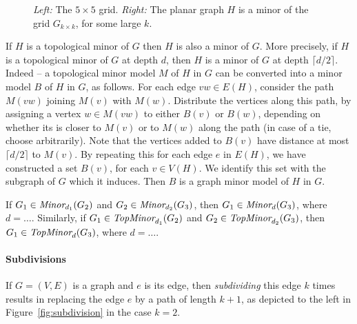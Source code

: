 \begin{example}
\begin{figure}[h]
	  \caption{\emph{Left:} The $5\times 5$ grid.
	  \emph{Right:} The planar graph $H$ is a minor of the grid $G_{k\times k}$,
	  for some large $k$.
	  } 
	  \label{fig:grid}
	\end{figure}	

\end{example}

\begin{example}\label{ex:topminor-minor}
	If $H$ is a topological minor of $G$ then $H$ is also a minor of $G$.
	More precisely, if $H$ is a topological minor of $G$ at depth $d$,
	then $H$ is a minor of $G$ at depth $\lceil d/2 \rceil$.
	Indeed -- a topological minor model $M$ of $H$ in $G$
	can be converted into a minor model $B$ of $H$ in $G$, as follows.
	For each edge $vw\in E(H)$, consider the path $M(vw)$ joining $M(v)$
	with $M(w)$. Distribute the vertices along this path, by assigning a vertex $w\in M(vw)$ 
	to either $B(v)$ or $B(w)$, depending on whether its is closer to $M(v)$
	or to $M(w)$ along the path (in case of a tie, choose arbitrarily).
	Note that the vertices added to $B(v)$ have distance at most $\lceil d/2\rceil$ to $M(v)$.
	By repeating this for each edge $e$ in $E(H)$, we have constructed a set $B(v)$, for each $v\in V(H)$. We identify this set with the subgraph of $G$ which it induces. Then $B$ is a graph minor model of $H$ in $G$.
\end{example}

\begin{lemma}\label{lem:minor-transitivity}
  If $G_1\in\textit{Minor}_{d_1}(G_2)$ and $G_2\in\textit{Minor}_{d_2}(G_3)$,
  then $G_1\in\textit{Minor}_{d}(G_3)$, where $d=\ldots$.
  Similarly, 
  if $G_1\in\textit{TopMinor}_{d_1}(G_2)$ and $G_2\in\textit{TopMinor}_{d_2}(G_3)$,
  then $G_1\in\textit{TopMinor}_{d}(G_3)$, where $d=\ldots$.
\end{lemma}



\paragraph{Subdivisions}
If $G=(V,E)$ is a graph and $e$ is its edge,
then \emph{subdividing} this edge  $k$ times results in replacing the edge $e$
by a path of length $k+1$, as depicted to the left in Figure~\ref{fig:subdivision} in the case $k=2$.


